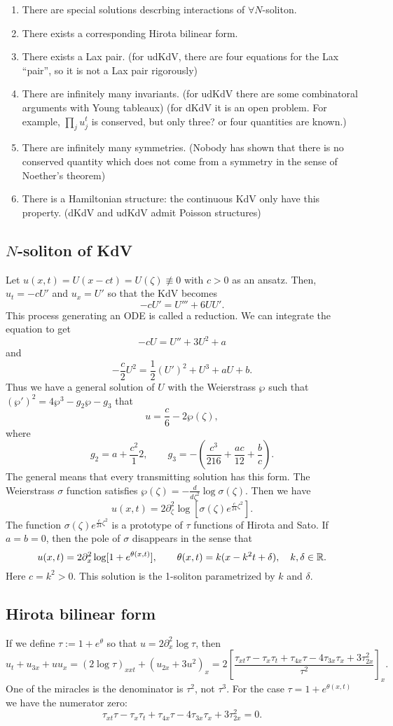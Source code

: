 \documentclass{../../../small}
\begin{document}
\begin{enumerate}
\item There are special solutions descrbing interactions of $\forall N$-soliton.
\item There exists a corresponding Hirota bilinear form.
\item There exists a Lax pair. (for udKdV, there are four equations for the Lax ``pair'', so it is not a Lax pair rigorously)
\item There are infinitely many invariants. (for udKdV there are some combinatoral arguments with Young tableaux) (for dKdV it is an open problem. For example, $\prod_ju_j^t$ is conserved, but only three? or four quantities are known.)
\item There are infinitely many symmetries. (Nobody has shown that there is no conserved quantity which does not come from a symmetry in the sense of Noether's theorem)
\item There is a Hamiltonian structure: the continuous KdV only have this property. (dKdV and udKdV admit Poisson structures)
\end{enumerate}

\subsection*{$N$-soliton of KdV}

Let $u(x,t)=U(x-ct)=U(\zeta)\not\equiv0$ with $c>0$ as an ansatz.
Then, $u_t=-cU'$ and $u_x=U'$ so that the KdV becomes
\[-cU'=U'''+6UU'.\]
This process generating an ODE is called a reduction.
We can integrate the equation to get
\[-cU=U''+3U^2+a\]
and
\[-\frac c2U^2=\frac12(U')^2+U^3+aU+b.\]
Thus we have a general solution of $U$ with the Weierstrass $\wp$ such that $(\wp')^2=4\wp^3-g_2\wp-g_3$ that
\[u=\frac c6-2\wp(\zeta),\]
where 
\[g_2=a+\frac{c^2}12,\qquad g_3=-(\frac{c^3}{216}+\frac{ac}{12}+\frac bc).\]
The general means that every transmitting solution has this form.
The Weierstrass $\sigma$ function satisfies $\wp(\zeta)=-\frac d{d\zeta^2}\log\sigma(\zeta)$.
Then we have
\[u(x,t)=2\partial_\zeta^2\log[\sigma(\zeta)e^{\frac c{24}\zeta^2}].\]
The function $\sigma(\zeta)e^{\frac c{24}\zeta^2}$ is a prototype of $\tau$ functions of Hirota and Sato.
If $a=b=0$, then the pole of $\sigma$ disappears in the sense that
\[u(x,t)=2\partial_x^2\log[1+e^{\theta(x,t)}],\qquad\theta(x,t)=k(x-k^2t+\delta),\quad k,\delta\in\mathbb{R}.\]
Here $c=k^2>0$.
This solution is the 1-soliton parametrized by $k$ and $\delta$.

\subsection*{Hirota bilinear form}
If we define $\tau:=1+e^\theta$ so that $u=2\partial_x^2\log\tau$, then
\[u_t+u_{3x}+uu_x=(2\log\tau)_{xxt}+(u_{2x}+3u^2)_x=2\left[\frac{\tau_{xt}\tau-\tau_x\tau_t+\tau_{4x}\tau-4\tau_{3x}\tau_x+3\tau_{2x}^2}{\tau^2}\right]_x.\]
One of the miracles is the denominator is $\tau^2$, not $\tau^3$.
For the case $\tau=1+e^{\theta(x,t)}$ we have the numerator zero:
\[\tau_{xt}\tau-\tau_x\tau_t+\tau_{4x}\tau-4\tau_{3x}\tau_x+3\tau_{2x}^2=0.\]
\end{document}

